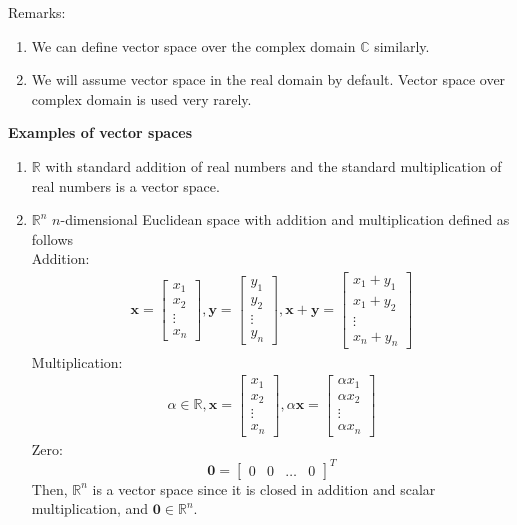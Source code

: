 \documentclass[11pt]{article}
\newcommand{\R}{\mathbb{R}}
\newcommand{\C}{\mathbb{C}}
\newcommand{\vx}{\mathbf{x}}
\newcommand{\vy}{\mathbf{y}}
\newcommand{\vzero}{\mathbf{0}}
\begin{document}
Remarks: \begin{enumerate}
\item We can define vector space over the complex domain $\C$ similarly.
\item We will assume vector space in the real domain by default. Vector space over complex domain is used very rarely.
\end{enumerate}
\textbf{Examples of vector spaces}
\begin{enumerate}
\item $\R$ with standard addition of real numbers and the standard multiplication of real numbers is a vector space.
\item $\R^n$ $n$-dimensional Euclidean space with addition and multiplication defined as follows\\
Addition:
\begin{align*}
\vx = \begin{bmatrix}
x_1\\ x_2\\ \vdots\\ x_n
\end{bmatrix}, \vy = \begin{bmatrix}
y_1\\ y_2\\ \vdots\\ y_n
\end{bmatrix}, \vx + \vy = \begin{bmatrix}
x_1 + y_1\\ x_1 + y_2\\ \vdots\\x_n + y_n
\end{bmatrix}
\end{align*}
Multiplication:
\begin{align*}
\alpha \in \R, \vx = \begin{bmatrix}
x_1\\ x_2\\ \vdots\\ x_n
\end{bmatrix}, \alpha \vx = \begin{bmatrix}
\alpha x_1\\ \alpha x_2\\ \vdots\\ \alpha x_n
\end{bmatrix}
\end{align*}
Zero: $$ \vzero = \begin{bmatrix}
0& 0& \dots& 0
\end{bmatrix}^T$$
Then, $\R^n$ is a vector space since it is closed in addition and scalar multiplication, and $\vzero \in \R^n$.

\end{enumerate}
\end{document}
